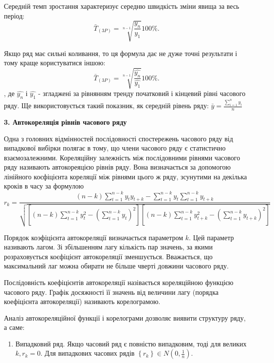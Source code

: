 \documentclass[a4paper, fontsize=14pt, oneside]{scrartcl}
\begin{document}
       Середній темп зростання характеризує середню швидкість зміни явища за весь період: \[ \bar{T}_{(3P)} = \sqrt[n-1]{\frac{y_{n}}{y_{1}}} 100\%. \]
       
       Якщо ряд має сильні коливання, то ця формула дає не дуже точні результати і тому краще користуватися іншою: \[ \bar{T}_{(3P)} = \sqrt[n-1]{\frac{\widehat{y_{n}}}{\widehat{y_{1}}}} 100\%. \], де $\widehat{y_{n}}$ і $\widehat{y_{1}}$ - згладжені за рівнянням тренду початковий і кінцевий рівні часового ряду.
       Ще використовується такий показник, як середній рівень ряду: $ \bar{y} = \frac{\sum\limits_{i=1}^{n} y_{i}}{n} $
       
       \begin{center}
		\Large{\textbf{3. Автокореляція рівнів часового ряду}}
		\end{center}
        
        Одна з головних відмінностей послідовності спостережень часового ряду від випадкової вибірки полягає в тому, що члени часового ряду є статистично взаємозалежними. Кореляційну залежність між послідовними рівнями часового ряду називають автокореяцією рівнів ряду. Вона визначається за допомогою лінійного коєфіцієнта кореляції між рівнями цього ж ряду, зсунутими на декілька кроків в часу за формулою \[ r_{k} = \frac{(n-k)\sum\limits_{t=1}^{n-k}y_{t}y_{t+k} - \sum\limits_{t=1}^{n-k}y_{t} \sum\limits_{t=1}^{n-k}y_{t+k}}{\sqrt{[(n-k) \sum\limits_{t=1}^{n-k}y_{t}^{2} - (\sum\limits_{t=1}^{n-k}y_{t})^{2}][(n-k)\sum\limits_{t=1}^{n-k}y_{t+k}^{2} - (\sum\limits_{t=1}^{n-k}y_{t+k})^{2}]}} \]
        
        Порядок коэфіцієнта автокореляції визначається параметром $k$. Цей параметр називають лагом. Зі збільшенням лагу кількість пар значень, за якими розраховується коєфіцієнт автокореляції зменшується. Вважається, що максимальний лаг можна обирати не більше чверті довжини часового ряду. 
        
        Послідовність коефіцієнтів автокореляції назівається кореляційною функцією часового ряду. Графік досяжності її значень від величини лагу (порядка коефіцієнта автокореляції) називають корелограмою.
        
        Аналіз автокореляційної функції і корелограми дозволяє виявити структуру ряду, а саме:
        \begin{enumerate}
			\item  Випадковий ряд. Якщо часовий ряд є повністю випадковим, тоді для великих $k, r_{k} = 0 $. Для випадкових часових рядів $\left\{ r_{k} \right \} \in N(0, \frac{1}{n})$.
		\end{enumerate}
        
\end{document}
